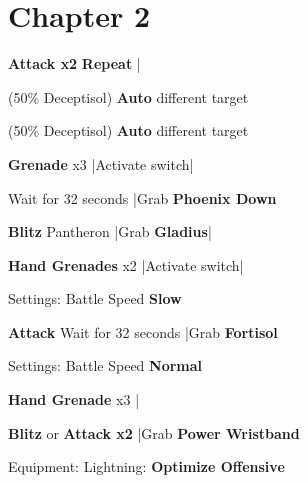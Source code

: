 \section{Chapter 2}

\begin{mainlist}
	\item {}
	\item {} \textbf{Attack x2} \to \textbf{Repeat} |\skip
	\item {} (50\% Deceptisol)
		\textbf{Auto} different target
	\item {} (50\% Deceptisol)
		\textbf{Auto} different target
	\item {}
	\item {} \textbf{Grenade} x3 |Activate switch|
	\item {} Wait for 32 seconds
		|Grab \textbf{Phoenix Down}
	\item {} \textbf{Blitz} Pantheron
		|Grab \textbf{Gladius}|
	\item {} \textbf{Hand Grenades} x2
		|Activate switch|\skip
\end{mainlist}
\begin{menu}
	\item Settings: Battle Speed \textbf{Slow}
\end{menu}
\begin{mainlist}
	\item {}
	\item {} \textbf{Attack} \to Wait for 32 seconds
		|Grab \textbf{Fortisol}
\end{mainlist}
\begin{menu}
	\item Settings: Battle Speed \textbf{Normal}
\end{menu}
\begin{mainlist}
	\item \skip
	\item {} \textbf{Hand Grenade} x3 |
	\item {} \textbf{Blitz} or \textbf{Attack x2}
		|Grab \textbf{Power Wristband}
\end{mainlist}
\begin{menu}
	\item Equipment: Lightning: \textbf{Optimize Offensive}
\end{menu}
